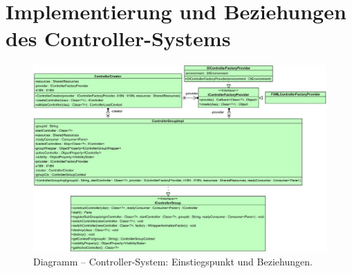 \chapter{Implementierung und Beziehungen des Controller-Systems}
\label{appendix:controller_system}
\begin{figure}[H]
	\centering
	\includegraphics[angle=90,height=\textheight-2.2cm]{Abbildungen/Controller-System-Full.png}
	\caption*{Diagramm -- Controller-System: Einstiegspunkt und Beziehungen.}
\end{figure}